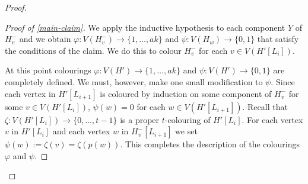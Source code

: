 \documentclass[kpfonts]{patmorin}
\theoremstyle{named}
\begin{document}
\begin{proof}
\begin{proof}[Proof of \cref{main-claim}]
       We apply the inductive hypothesis to each component $Y$ of $H^-_v$ and we obtain $\varphi:V(H^-_v)\to\{1,\ldots,ak\}$ and $\psi:V(H_w)\to\{0,1\}$ that satisfy the conditions of the claim.  We do this to colour $H^-_v$ for each $v\in V(H'[L_i])$.


       At this point colourings $\varphi:V(H')\to\{1,\ldots,ak\}$ and $\psi:V(H')\to\{0,1\}$ are completely defined.  We must, however, make one small modification to $\psi$.  Since each vertex in $H'[L_{i+1}]$ is coloured by induction on some component of $H^-_v$ for some $v\in V(H'[L_i])$, $\psi(w)=0$ for each $w\in V(H'[L_{i+1}])$.
       Recall that $\zeta:V(H'[L_i])\to\{0,\ldots,t-1\}$ is a proper $t$-colouring of $H'[L_i]$.  For each vertex $v$ in $H'[L_i]$ and each vertex $w$ in $H^-_v[L_{i+1}]$ we set $\psi(w):=\zeta(v)=\zeta(p(w))$.  This completes the description of the colourings $\varphi$ and $\psi$.


\end{proof}
\end{proof}
\end{document}
